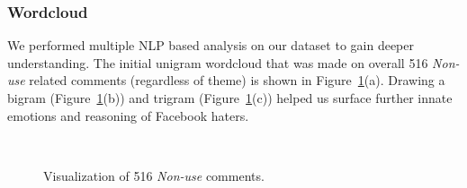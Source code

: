 \subsubsection{Wordcloud}
We performed multiple NLP based analysis on our dataset to gain deeper understanding. The initial unigram wordcloud that was made on overall 516 \textit{Non-use} related comments (regardless of theme) is shown in Figure~\ref{fig:figure2}(a). Drawing a bigram (Figure~\ref{fig:figure2}(b)) and trigram (Figure~\ref{fig:figure2}(c)) helped us surface further innate emotions and reasoning of Facebook haters.





\begin{figure}
\hfill
{}\hfill
{}
\caption{Visualization of 516 \textit{Non-use} comments.}~\label{fig:figure2}
\end{figure}




